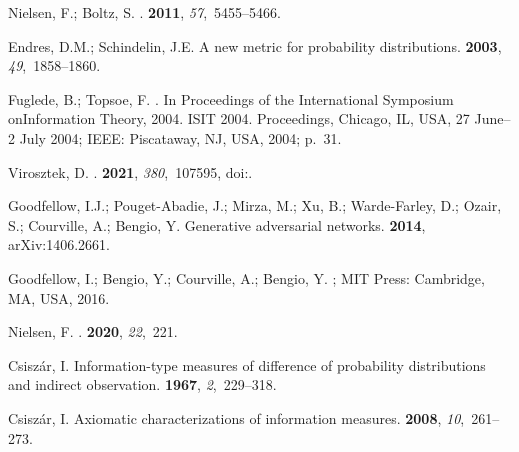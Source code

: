 \documentclass[entropy,article,accept,oneauthor,pdftex,entropy]{Definitions/mdpi}
\begin{document}
\begin{thebibliography}{999}
Nielsen, F.; Boltz, S.
.
 {\bf 2011}, {\em
  57},~5455--5466.

Endres, D.M.; Schindelin, J.E.
\newblock A new metric for probability distributions.
 {\bf 2003}, {\em
  49},~1858--1860.

Fuglede, B.; Topsoe, F.
.
\newblock   In Proceedings of the International Symposium onInformation Theory, 2004. ISIT 2004.  Proceedings, {Chicago, IL, USA, 27 June--2 July} 2004;  IEEE: {Piscataway, NJ, USA,}  2004; p.~31.

Virosztek, D.
.
 {\bf 2021}, {\em 380},~107595,
\newblock
  doi:{\href{https://doi.org/https://doi.org/10.1016/j.aim.2021.107595}{}}.

Goodfellow, I.J.; Pouget-Abadie, J.; Mirza, M.; Xu, B.; Warde-Farley, D.;
  Ozair, S.; Courville, A.; Bengio, Y.
\newblock Generative adversarial networks.
 {\bf 2014}, arXiv:1406.2661.

Goodfellow, I.; Bengio, Y.; Courville, A.; Bengio, Y.
; MIT Press: Cambridge, MA, USA, 2016.

Nielsen, F.
.
 {\bf 2020}, {\em 22},~221.

Csisz{\'a}r, I.
\newblock Information-type measures of difference of probability distributions
  and indirect observation.
 {\bf 1967}, {\em
  2},~229--318.

Csisz{\'a}r, I.
\newblock Axiomatic characterizations of information measures.
 {\bf 2008}, {\em 10},~261--273.


\end{thebibliography}
\end{document}
